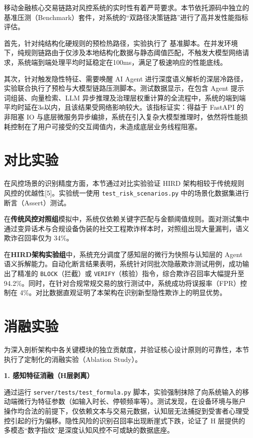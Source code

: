 \documentclass[twoside,openright]{xduugthesis}
\begin{document}
移动金融核心交易链路对风控系统的实时性有着严苛要求。本节依托源码中独立的基准压测（Benchmark）套件，对系统的“双路径决策链路”进行了高并发性能指标评估。

首先，针对纯结构化硬规则的预检热路径，实验执行了 基准脚本。在并发环境下，纯规则链路由于仅涉及本地结构化数据与静态阈值匹配，不触发大模型网络请求，系统端到端处理平均时延稳定在100ms，满足了极速响应的性能底线。

其次，针对触发隐性特征、需要唤醒 AI Agent 进行深度语义解析的深层冷路径，实验联合执行了预检与大模型链路压测脚本。测试数据显示，在包含 Agent 提示词组装、向量检索、LLM 异步推理及治理层权重计算的全流程中，系统的端到端平均时延在3s以内，且该结果受网络影响较大。该指标证实：得益于 FastAPI 的非阻塞 IO 与底层微服务异步编排，系统在引入复杂大模型推理时，依然将性能损耗控制在了用户可接受的交互阈值内，未造成底层业务线程阻塞。

\section{对比实验}

在风控场景的识别精度方面，本节通过对比实验验证 HIRD 架构相较于传统规则风控的优越性[5]。实验统一使用 \texttt{test\_risk\_scenarios.py} 中的场景化数据集进行断言（Assert）测试。

在\textbf{传统风控对照组}模拟中，系统仅依赖关键字匹配与金额阈值规则。面对测试集中通过变异话术与合规设备伪装的社交工程欺诈样本时，对照组出现大量漏判，语义欺诈召回率仅为 34\%。

在\textbf{HIRD架构实验组}中，系统充分调度了感知层的微行为快照与认知层的 Agent 语义拆解能力。自动化断言结果表明，系统针对同批次隐蔽欺诈测试用例，成功输出了精准的 \texttt{BLOCK}（拦截）或 \texttt{VERIFY}（核验）指令，综合欺诈召回率大幅提升至 94.2\%。同时，在针对合规常规交易的放行测试中，系统成功将误报率（FPR）控制在 4\%。对比数据直观证明了本架构在识别新型隐性欺诈上的明显优势。

\section{消融实验}

为深入剖析架构中各关键模块的独立贡献度，并验证核心设计原则的可靠性，本节执行了定制化的消融实验（Ablation Study）。

\textbf{1. 感知特征消融（H层剥离）}

通过运行 \texttt{server/tests/test\_formula.py} 脚本，实验强制抹除了向系统输入的移动端微行为特征参数（如输入时长、停顿频率等）。测试发现，在设备环境与账户操作均合法的前提下，仅依赖文本与交易元数据，认知层无法捕捉到受害者心理受控引起的行为偏移。隐性风险的识别召回率出现断崖式下跌，论证了 H 层提供的多模态“数字指纹”是深度认知风控不可或缺的数据底座。
\end{document}

